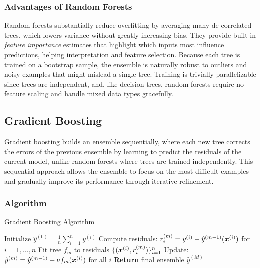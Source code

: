 \subsubsection{Advantages of Random Forests}

Random forests substantially reduce overfitting by averaging many de-correlated trees, which lowers variance without greatly increasing bias. They provide built-in \emph{feature importance} estimates that highlight which inputs most influence predictions, helping interpretation and feature selection. Because each tree is trained on a bootstrap sample, the ensemble is naturally robust to outliers and noisy examples that might mislead a single tree. Training is trivially parallelizable since trees are independent, and, like decision trees, random forests require no feature scaling and handle mixed data types gracefully.

\subsection{Gradient Boosting}

Gradient boosting builds an ensemble sequentially, where each new tree corrects the errors of the previous ensemble by learning to predict the residuals of the current model, unlike random forests where trees are trained independently. This sequential approach allows the ensemble to focus on the most difficult examples and gradually improve its performance through iterative refinement.

\subsubsection{Algorithm}

\begin{algorithm}[htbp]
\caption{Gradient Boosting Algorithm}
\label{alg:gradient-boosting}
\begin{algorithmic}[1]
\State Initialize $\hat{y}^{(0)} = \frac{1}{n} \sum_{i=1}^{n} y^{(i)}$ 
    \State Compute residuals: $r_i^{(m)} = y^{(i)} - \hat{y}^{(m-1)}(\boldsymbol{x}^{(i)})$ for $i = 1, \ldots, n$
    \State Fit tree $f_m$ to residuals $\{(\boldsymbol{x}^{(i)}, r_i^{(m)})\}_{i=1}^{n}$
    \State Update: $\hat{y}^{(m)} = \hat{y}^{(m-1)} + \nu f_m(\boldsymbol{x}^{(i)})$ for all $i$
\EndFor
\State \textbf{Return} final ensemble $\hat{y}^{(M)}$
\end{algorithmic}
\end{algorithm}

